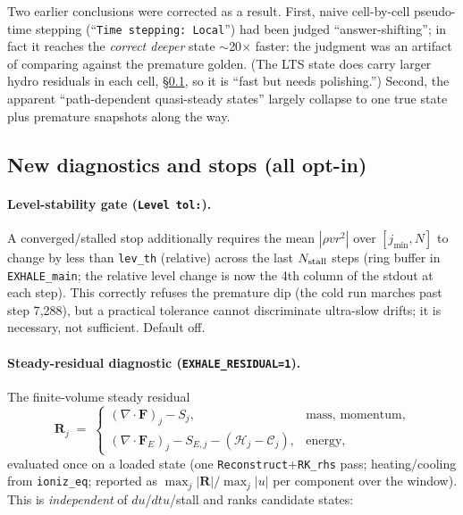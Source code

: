 \documentclass[english,a4paper]{my_memo}
\newcommand{\Rres}{\mathbf{R}}
\newcommand{\code}[1]{\texttt{#1}}
\begin{document}
Two earlier conclusions were corrected as a result. First, naive cell-by-cell
pseudo-time stepping (``\code{Time stepping: Local}'') had been judged
``answer-shifting''; in fact it reaches the \emph{correct deeper} state
$\sim$20$\times$ faster: the judgment was an artifact of comparing
against the premature golden. (The LTS state does carry larger
hydro residuals in each cell, \S\ref{sec:diag}, so it is ``fast but needs polishing.'')
Second, the apparent ``path-dependent quasi-steady states'' largely
collapse to one true state plus premature snapshots along the way.

\subsection{New diagnostics and stops (all opt-in)}\label{sec:diag}

\paragraph{Level-stability gate (\code{Level tol:}).} A converged/stalled
stop additionally requires the mean $|\rho v r^2|$ over $[j_{\min},N]$ to
change by less than \code{lev\_th} (relative) across the last
$N_{\rm stall}$ steps (ring buffer in \code{EXHALE\_main}; the relative level
change is now the 4th column of the stdout at each step). This correctly
refuses the premature dip (the cold run marches past step 7{,}288), but a
practical tolerance cannot discriminate ultra-slow drifts; it is necessary,
not sufficient. Default off.

\paragraph{Steady-residual diagnostic (\code{EXHALE\_RESIDUAL=1}).}
The finite-volume steady residual
\begin{equation}
\Rres_j \;=\;
\begin{cases}
(\nabla\!\cdot\!\mathbf{F})_j - S_j, & \text{mass, momentum},\\[2pt]
(\nabla\!\cdot\!\mathbf{F}_E)_j - S_{E,j} - (\mathcal{H}_j-\mathcal{C}_j),
& \text{energy},
\end{cases}
\label{eq:resid}
\end{equation}
evaluated once on a loaded state (one \code{Reconstruct}+\code{RK\_rhs}
pass; heating/cooling from \code{ioniz\_eq}; reported as
$\max_j|\Rres|/\max_j|u|$ per component over the window). This is
\emph{independent} of $du$/$dtu$/stall and ranks candidate states:
\end{document}
